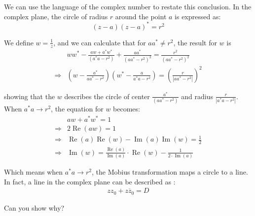 \documentclass[]{ctexart}
\begin{document}
		We can use the language of the complex number to restate this conclusion. In the complex plane, the circle of radius $r$ around the point $a$ is expressed as: 
			\begin{equation*}
				(z-a)(z-a)^{*}=r^{2}
			\end{equation*}
			
		We define $w=\frac{1}{z}$, and we can calculate that for $a a^{*} \neq r^{2}$, the result for $w$ is
			\begin{equation*}
			\begin{aligned}
				&w w^{*}-\frac{a w+a^{*} w^*}{\left(a^{*} a-r^{2}\right)}+\frac{a a^{*}}{\left(a a^{*}-r^{2}\right)^{2}}=\frac{r^{2}}{\left(a a^{*}-r^{2}\right)^{2}} \\
				\Rightarrow&\left(w-\frac{a^{*}}{a a^{*}-r^{2}}\right)\left(w^*-\frac{a}{a^{*} a-r^{2}}\right)=\left(\frac{r}{\left|a a^{*}-r^{2}\right|}\right)^{2}
			\end{aligned}
			\end{equation*}
		
		showing that the $w$ describes the circle of center $\frac{a^*}{\left(a a^*-r^{2}\right)}$ and radius $\frac{r}{\left|a^{*} a-r^{2}\right|}$.
		When $a^{*} a \rightarrow r^{2}$, the equation for $w$ becomes:
			\begin{equation*}
			\begin{aligned}
				& a w+a^{*} w^{*}=1 \\
				\Rightarrow &2 \operatorname{Re}(aw)=1 \\
				\Rightarrow &\operatorname{Re}(a) \operatorname{Re}(w)-\operatorname{Im}(a) \operatorname{Im}(w)=\frac{1}{2} \\
				\Rightarrow &\operatorname{Im}(w) =\frac{\operatorname{Re}(a)}{\operatorname{Im}(a)} \cdot \operatorname{Re}(w)-\frac{1}{2 \cdot \operatorname{Im}(a)}
			\end{aligned}
			\end{equation*}
		
		Which means when $a^{*} a \rightarrow r^{2}$, the Mobius transformation maps a circle to a line. In fact, a line in the complex plane can be described as :
			\begin{equation*}
			\begin{aligned}
				zz_0+\overline{zz_0}=D
			\end{aligned}
			\end{equation*}
		
		Can you show why?
		
\end{document}
